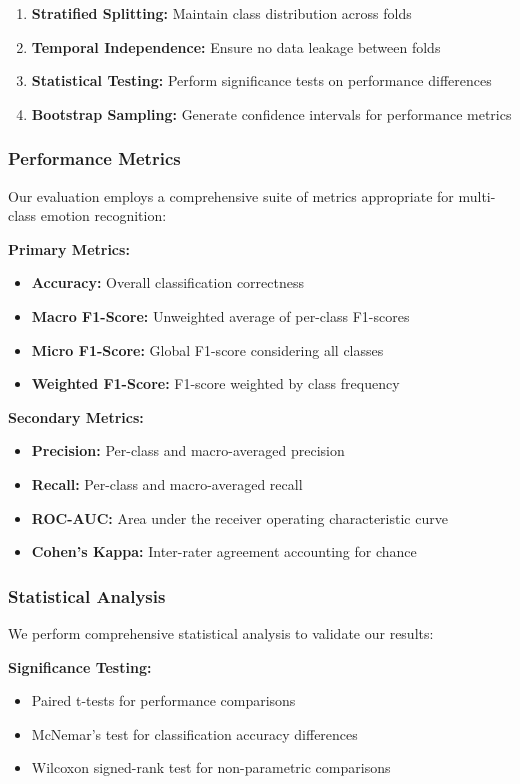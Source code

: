\documentclass[conference]{IEEEtran}
\begin{document}
\begin{enumerate}
    \item \textbf{Stratified Splitting:} Maintain class distribution across folds
    \item \textbf{Temporal Independence:} Ensure no data leakage between folds
    \item \textbf{Statistical Testing:} Perform significance tests on performance differences
    \item \textbf{Bootstrap Sampling:} Generate confidence intervals for performance metrics
\end{enumerate}

\subsubsection{Performance Metrics}
Our evaluation employs a comprehensive suite of metrics appropriate for multi-class emotion recognition:

\textbf{Primary Metrics:}
\begin{itemize}
    \item \textbf{Accuracy:} Overall classification correctness
    \item \textbf{Macro F1-Score:} Unweighted average of per-class F1-scores
    \item \textbf{Micro F1-Score:} Global F1-score considering all classes
    \item \textbf{Weighted F1-Score:} F1-score weighted by class frequency
\end{itemize}

\textbf{Secondary Metrics:}
\begin{itemize}
    \item \textbf{Precision:} Per-class and macro-averaged precision
    \item \textbf{Recall:} Per-class and macro-averaged recall
    \item \textbf{ROC-AUC:} Area under the receiver operating characteristic curve
    \item \textbf{Cohen's Kappa:} Inter-rater agreement accounting for chance
\end{itemize}

\subsubsection{Statistical Analysis}
We perform comprehensive statistical analysis to validate our results:

\textbf{Significance Testing:}
\begin{itemize}
    \item Paired t-tests for performance comparisons
    \item McNemar's test for classification accuracy differences
    \item Wilcoxon signed-rank test for non-parametric comparisons
\end{itemize}
\end{document}
